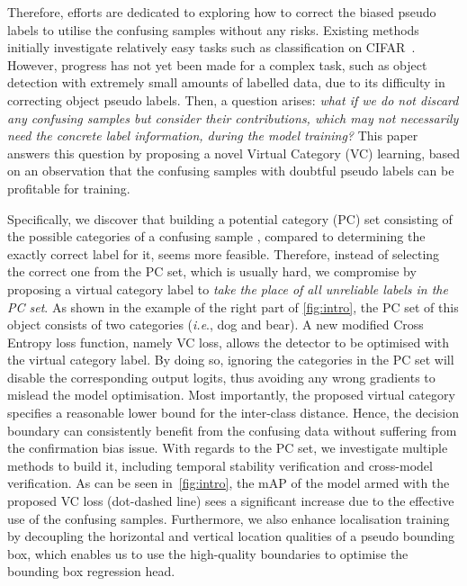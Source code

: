 \documentclass[runningheads]{llncs}
\def\ie{\emph{i.e}., } \def\Ie{\emph{I.e}., }
\begin{document}
Therefore, efforts are dedicated to exploring how to correct the biased pseudo labels to utilise the confusing samples without any risks. Existing methods~\cite{Xinshao_2021_Pro,Junnan_2020_CoM} initially investigate relatively easy tasks such as classification on CIFAR~\cite{krizhevsky2009learning}. 
However, progress has not yet been made for a complex task, such as object detection with extremely small amounts of labelled data, due to its difficulty in correcting object pseudo labels. Then, a question arises: \textit{what if we do not discard any confusing samples but consider their contributions, which may not necessarily need the concrete label information, during the model training?} This paper answers this question by proposing a novel Virtual Category (VC) learning, based on an observation that the confusing samples with doubtful pseudo labels can be profitable for training. 

Specifically, we discover that building a potential category (PC) set consisting of the possible categories of a confusing sample , compared to determining the exactly correct label for it, seems more feasible. Therefore, instead of selecting the correct one from the PC set, which is usually hard, we compromise by proposing a virtual category label to \textit{take the place of all unreliable labels in the PC set}. As shown in the example of the right part of \cref{fig:intro}, the PC set of this object consists of two categories (\ie dog and bear). A new modified Cross Entropy loss function, namely VC loss, allows the detector to be optimised with the virtual category label. By doing so, ignoring the categories in the PC set will disable the corresponding output logits, thus avoiding any wrong gradients to mislead the model optimisation. Most importantly, the proposed virtual category specifies a reasonable lower bound for the inter-class distance. Hence, the decision boundary can consistently benefit from the confusing data without suffering from the confirmation bias issue. With regards to the PC set, we investigate multiple methods to build it, including temporal stability verification and cross-model verification.  As can be seen in~\cref{fig:intro}, the mAP of the model armed with the proposed VC loss (dot-dashed line) sees a significant increase due to the effective use of the confusing samples. Furthermore, we also enhance localisation training by decoupling the horizontal and vertical location qualities of a pseudo bounding box, which enables us to use the high-quality boundaries to optimise the bounding box regression head.  
\end{document}
